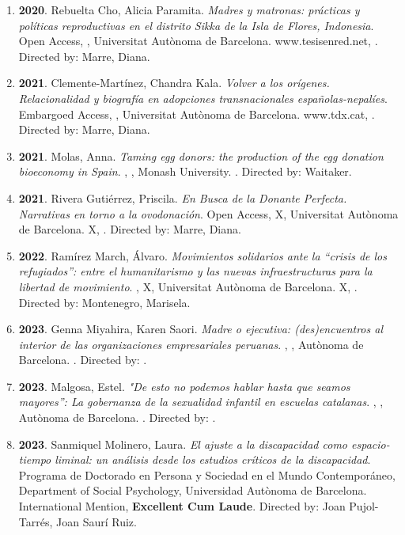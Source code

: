 \begin{enumerate}
\item {\bf 2020}. Rebuelta Cho, Alicia Paramita. {\it Madres y matronas: prácticas y políticas reproductivas en el distrito Sikka de la Isla de Flores, Indonesia}. Open Access, , Universitat Autònoma de Barcelona. www.tesisenred.net,  {\bf }. Directed by: Marre, Diana.\filbreak
\item {\bf 2021}. Clemente-Martínez, Chandra Kala. {\it Volver a los orígenes. Relacionalidad y biografía en adopciones transnacionales españolas-nepalíes}. Embargoed Access, , Universitat Autònoma de Barcelona. www.tdx.cat,  {\bf }. Directed by: Marre, Diana.\filbreak
\item {\bf 2021}. Molas, Anna. {\it Taming egg donors: the production of the egg donation bioeconomy in Spain}. , , Monash University.  {\bf }. Directed by: Waitaker.\filbreak
\item {\bf 2021}. Rivera Gutiérrez, Priscila. {\it En Busca de la Donante Perfecta. Narrativas en torno a la ovodonación}. Open Access, X, Universitat Autònoma de Barcelona. X,  {\bf }. Directed by: Marre, Diana.\filbreak
\item {\bf 2022}. Ramírez March, Álvaro. {\it Movimientos solidarios ante la “crisis de los refugiados”: entre el humanitarismo y las nuevas infraestructuras para la libertad de movimiento}. , X, Universitat Autònoma de Barcelona. X,  {\bf }. Directed by: Montenegro, Marisela.\filbreak
\item {\bf 2023}. Genna Miyahira, Karen Saori. {\it Madre o ejecutiva: (des)encuentros al interior de las organizaciones empresariales peruanas}. , , Autònoma de Barcelona.  {\bf }. Directed by: .\filbreak
\item {\bf 2023}. Malgosa, Estel. {\it "De esto no podemos hablar hasta que seamos mayores”: La gobernanza de la sexualidad infantil en escuelas catalanas}. , , Autònoma de Barcelona.  {\bf }. Directed by: .\filbreak
\item {\bf 2023}. Sanmiquel Molinero, Laura. {\it El ajuste a la discapacidad como espacio-tiempo liminal: un análisis desde los estudios críticos de la discapacidad}. Programa de Doctorado en Persona y Sociedad en el Mundo Contemporáneo, Department of Social Psychology, Universidad Autònoma de Barcelona. International Mention,  {\bf Excellent Cum Laude}. Directed by: Joan Pujol-Tarrés, Joan Saurí Ruiz.\filbreak
\end{enumerate} 
